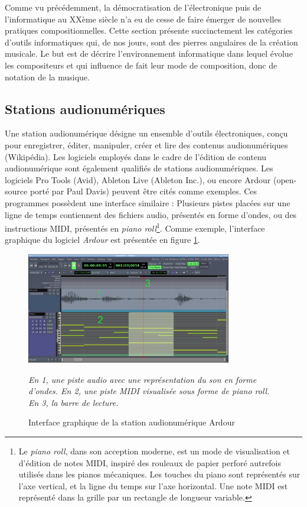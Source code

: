 Comme vu précédemment, la démocratisation de l'électronique puis de l'informatique au XXème siècle n'a eu de cesse de faire émerger de nouvelles pratiques compositionnelles.
Cette section présente succinctement les catégories d'outils informatiques qui, de nos jours, sont des pierres angulaires de la création musicale. Le but est de décrire l'environnement informatique dans lequel évolue les compositeurs et qui influence de fait leur mode de composition, donc de notation de la musique. 

\subsection{Stations audionumériques}
\label{subsec:stationAudionum}
Une station audionumérique désigne un \og ensemble d'outils électroniques, conçu pour enregistrer, éditer, manipuler, créer et lire des contenus audionumériques \fg (Wikipédia).
Les logiciels employés dans le cadre de l'édition de contenu audionumérique sont également qualifiés de stations audionumériques.
Les logiciels Pro Tools (Avid), Ableton Live (Ableton Inc.), ou encore Ardour (open-source porté par Paul Davis) peuvent être cités comme exemples.
Ces programmes possèdent une interface similaire : Plusieurs pistes placées sur une ligne de temps contiennent des fichiers audio, présentés en forme d'ondes, ou des instructions MIDI, présentés en \textit{piano roll}\footnote{Le \textit{piano roll}, dans son acception moderne, est un mode de visualisation et d'édition de notes MIDI, inspiré des rouleaux de papier perforé autrefois utilisés dans les pianos mécaniques. Les touches du piano sont représentés sur l'axe vertical, et la ligne du temps sur l'axe horizontal. Une note MIDI est représenté dans la grille par un rectangle de longueur variable.}. Comme exemple, l'interface graphique du logiciel \textit{Ardour} est présentée en figure \ref{fig:exempleDaw}. 

\begin{figure}[H]
	\centering
	\includegraphics[keepaspectratio=true, width=0.8\textwidth]{OutilsInformatiques/i/exempleDaw.png}
	\caption{Interface graphique de la station audionumérique Ardour}
	\label{fig:exempleDaw}
	\small
	\it
	En 1, une piste audio avec une représentation du son en forme d'ondes. En 2, une piste MIDI visualisée sous forme de piano roll. En 3, la barre de lecture.					
\end{figure}

